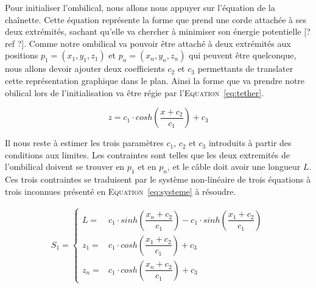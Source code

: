     Pour initialiser l'ombilical, nous allons nous appuyer sur l'équation de la chaînette. Cette équation représente la forme que prend une corde attachée à ses deux extrémités, sachant qu'elle va chercher à minimiser son énergie potentielle [? ref ?]. Comme notre ombilical va pouvoir être attaché à deux extrémités aux positions $p_1 = (x_1, y_1, z_1)$ et $p_n = (x_n, y_n, z_n)$ qui peuvent être quelconque, nous allons devoir ajouter deux coefficients $c_2$ et $c_3$ permettants de translater cette représentation graphique dans le plan. Ainsi la forme que va prendre notre obilical lors de l'initialisation va être régie par l'\textsc{Equation}~\ref{eq:tether}.

    \begin{equation}
        z = c_1\cdot cosh\left(\frac{x + c_2}{c_1}\right) + c_3
        \label{eq:tether}
    \end{equation}

    Il nous reste à estimer les trois paramètres $c_1$, $c_2$ et $c_3$ introduits à partir des conditions aux limites. Les contraintes sont telles que les deux extremités de l'ombilical doivent se trouver en $p_1$ et en $p_n$, et le câble doit avoir une longueur $L$. Ces trois contraintes se traduisent par le système non-linéaire de trois équations à trois inconnues présenté en \textsc{Equation}~\ref{eq:systeme} à résoudre.
    
    \begin{align}
        S_1 = 
        \begin{cases}
            L   = & c_1 \cdot sinh\left(\dfrac{x_n+c_2}{c_1}\right) - c_1 \cdot sinh\left(\dfrac{x_1+c_2}{c_1}\right) \\
            z_1 = & c_1 \cdot cosh\left(\dfrac{x_1+c_2}{c_1}\right)+c_3 \\
            z_n = & c_1 \cdot cosh\left(\dfrac{x_n+c_2}{c_1}\right)+c_3
        \end{cases}
        \label{eq:systeme}
    \end{align}

